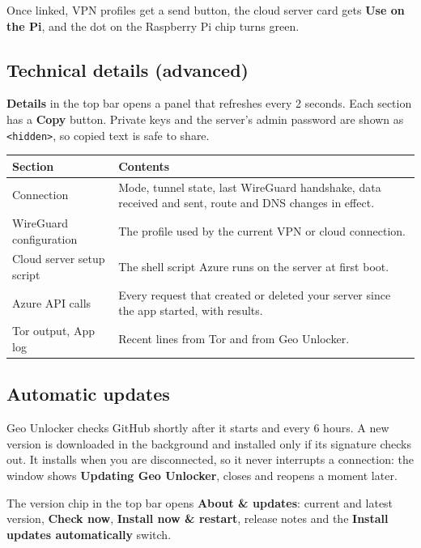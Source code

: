 \documentclass[11pt,a4paper]{article}
\newcommand{\ui}[1]{\textbf{#1}}            %
\newcommand{\file}[1]{\texttt{#1}}          %
\begin{document}
Once linked, VPN profiles get a send button, the cloud server card gets \ui{Use on the Pi}, and the dot on the Raspberry Pi chip turns green.

\subsection{Technical details (advanced)}

\ui{Details} in the top bar opens a panel that refreshes every 2 seconds. Each section has a \ui{Copy} button. Private keys and the server's admin password are shown as \file{<hidden>}, so copied text is safe to share.

\begin{center}
\begin{tabularx}{\linewidth}{@{}>{\raggedright\arraybackslash}p{4.2cm} L@{}}
\toprule
\textbf{Section} & \textbf{Contents} \\
\midrule
Connection & Mode, tunnel state, last WireGuard handshake, data received and sent, route and DNS changes in effect. \\
WireGuard configuration & The profile used by the current VPN or cloud connection. \\
Cloud server setup script & The shell script Azure runs on the server at first boot. \\
Azure API calls & Every request that created or deleted your server since the app started, with results. \\
Tor output, App log & Recent lines from Tor and from Geo Unlocker. \\
\bottomrule
\end{tabularx}
\end{center}

\subsection{Automatic updates}

Geo Unlocker checks GitHub shortly after it starts and every 6 hours. A new version is downloaded in the background and installed only if its signature checks out. It installs when you are disconnected, so it never interrupts a connection: the window shows \ui{Updating Geo Unlocker}, closes and reopens a moment later.

The version chip in the top bar opens \ui{About \& updates}: current and latest version, \ui{Check now}, \ui{Install now \& restart}, release notes and the \ui{Install updates automatically} switch.
\end{document}
